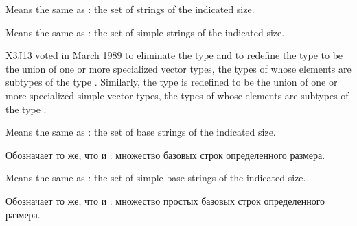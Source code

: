 \begin{obsolete}
\begin{flushdesc}
\item[\cd{(string \emph{size})}]
Means the same as
: the set of strings of the indicated size.

\item[\cd{(simple-string \emph{size})}]
Means the same
as : the set of simple
strings of the indicated size.
\end{flushdesc}
\end{obsolete}

\begin{newer}
X3J13 voted in March 1989 
to eliminate the type  and to redefine the type
 to be the union of one or more specialized vector
types, the types of whose elements are subtypes of the type .
Similarly, the type
 is redefined to be the union of one or more specialized
simple vector
types, the types of whose elements are subtypes of the type .

\begin{flushdesc}
\item[\cd{(base-string \emph{size})}]
Means the same as
: the set of base
strings of the indicated size.


\item[\cd{(base-string \emph{размер})}]
Обозначает то же, что и : множество
базовых строк определенного размера.


\item[\cd{(simple-base-string \emph{size})}]
Means the same
as : the set of simple base
strings of the indicated size.

\item[\cd{(simple-base-string \emph{размер})}]
Обозначает то же, что и : множество
простых базовых строк определенного размера.
\end{flushdesc}
\end{newer}

